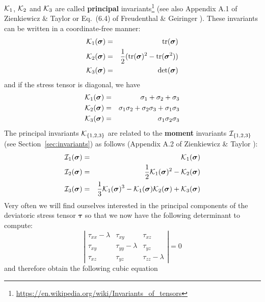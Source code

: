 
\noindent ${\cal K}_1$, ${\cal K}_2$ and ${\cal K}_3$ are called {\bf principal}
invariants\footnote{\url{https://en.wikipedia.org/wiki/Invariants_of_tensors}} 
(see also Appendix A.1 of Zienkiewicz \& Taylor \cite{zita2} or  Eq.~(6.4) of Freudenthal \& Geiringer \cite{frge58}). 
These invariants can be written in a coordinate-free manner:
\begin{eqnarray}
{\cal K}_1({\bm \sigma}) &=& {\rm tr}({\bm \sigma})  \nonumber\\
{\cal K}_2({\bm \sigma}) &=& \frac{1}{2}(  {\rm tr}({\bm \sigma}) ^2 - {\rm tr}({\bm \sigma}^2)  ) \nonumber\\
{\cal K}_3({\bm \sigma}) &=& \det ({\bm \sigma}) \nonumber
\end{eqnarray}
and if the stress tensor is diagonal, we have
\begin{eqnarray}
{\cal K}_1({\bm \sigma}) &=& \sigma_{1}+\sigma_{2}+\sigma_{3}\nonumber\\
{\cal K}_2({\bm \sigma}) &=& \sigma_{1}\sigma_{2}+\sigma_{2}\sigma_{3}+\sigma_{1}\sigma_{3} \nonumber\\
{\cal K}_3({\bm \sigma}) &=& \sigma_1\sigma_2\sigma_3 \nonumber
\end{eqnarray}
The principal invariants ${\cal K}_{\{1,2,3\}}$ are related to the {\bf moment} 
invariants ${\cal I}_{\{1,2,3\}}$ 
(see Section~\ref{sec:invariants}) as follows (Appendix A.2 of Zienkiewicz \& Taylor \cite{zita2}):
\begin{eqnarray}
{\cal I}_1({\bm \sigma})&=& {\cal K}_1({\bm \sigma}) \\ 
{\cal I}_2({\bm \sigma})&=& \frac{1}{2}{\cal K}_1({\bm \sigma})^2 -{\cal K}_2({\bm \sigma}) \label{eq:IK2}\\
{\cal I}_3({\bm \sigma})&=& \frac{1}{3}{\cal K}_1({\bm \sigma})^3 -{\cal K}_1({\bm \sigma}) 
{\cal K}_2({\bm \sigma}) + {\cal K}_3({\bm \sigma}) \label{eq:IK3}
\end{eqnarray}
Very often we will find ourselves interested in the principal components 
of the deviatoric stress tensor $\bm \tau$ so that we now have the following determinant to compute:
\[
\left|  
\begin{array}{ccc}
\tau_{xx}-\lambda & \tau_{xy} & \tau_{xz} \\
\tau_{xy} & \tau_{yy}-\lambda & \tau_{yz} \\
\tau_{xz} & \tau_{yz} & \tau_{zz} -\lambda
\end{array}
\right|
=0
\]
and therefore obtain the following cubic equation
